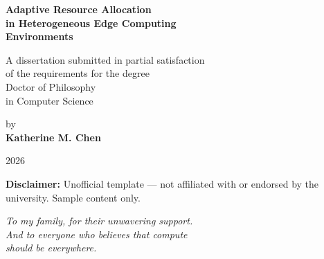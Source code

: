 \documentclass[12pt,oneside]{book}
\begin{document}
\begin{titlepage}
\thispagestyle{empty}
\singlespacing
\begin{center}

\vspace*{1.5in}

{\LARGE\bfseries\color{ucladark} Adaptive Resource Allocation\\[4pt]
in Heterogeneous Edge Computing\\[4pt]
Environments}

\vspace{0.8in}

{\large A dissertation submitted in partial satisfaction\\[4pt]
of the requirements for the degree\\[4pt]
Doctor of Philosophy\\[4pt]
in Computer Science}

\vspace{0.8in}

{\large by\\[4pt]
\textbf{Katherine M. Chen}}

\vspace{0.8in}

{\large 2026}

\vspace{1in}

\begin{tcolorbox}[
  colback=uclablue!5,
  colframe=uclablue!30,
  width=0.85\textwidth,
  center,
  boxrule=0.6pt,
  arc=3pt,
  before skip=0pt,
  after skip=0pt
]
\footnotesize\color{accentgray}
\textbf{Disclaimer:} Unofficial template --- not affiliated with or endorsed by
the university. Sample content only.
\end{tcolorbox}

\end{center}
\end{titlepage}

\thispagestyle{empty}
\vspace*{3in}
\begin{center}
\itshape To my family, for their unwavering support.\\[6pt]
And to everyone who believes that compute\\[4pt]
should be everywhere.
\end{center}
\end{document}
